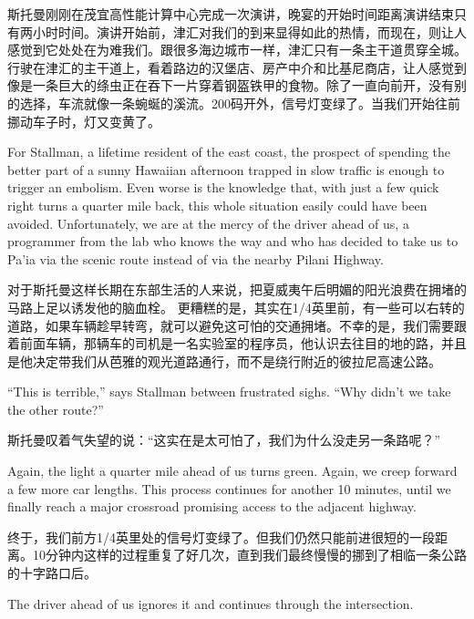 \ifdefined\chs
斯托曼刚刚在茂宜高性能计算中心完成一次演讲，晚宴的开始时间距离演讲结束只有两小时时间。演讲开始前，津汇对我们的到来显得如此的热情，而现在，则让人感觉到它处处在为难我们。跟很多海边城市一样，津汇只有一条主干道贯穿全城。行驶在津汇的主干道上，看着路边的汉堡店、房产中介和比基尼商店，让人感觉到像是一条巨大的绦虫正在吞下一片穿着钢盔铁甲的食物。除了一直向前开，没有别的选择，车流就像一条蜿蜒的溪流。200码开外，信号灯变绿了。当我们开始往前挪动车子时，灯又变黄了。
\fi

\ifdefined\eng
For Stallman, a lifetime resident of the east coast, the prospect of spending the better part of a sunny Hawaiian afternoon trapped in slow traffic is enough to trigger an embolism. %
Even worse is the knowledge that, with just a few quick right turns a quarter mile back, this whole situation easily could have been avoided. Unfortunately, we are at the mercy of the driver ahead of us, a programmer from the lab who knows the way and who has decided to take us to Pa'ia via the scenic route instead of via the nearby Pilani Highway.
\fi

\ifdefined\chs
对于斯托曼这样长期在东部生活的人来说，把夏威夷午后明媚的阳光浪费在拥堵的马路上足以诱发他的脑血栓。%
更糟糕的是，其实在1/4英里前，有一些可以右转的道路，如果车辆趁早转弯，就可以避免这可怕的交通拥堵。不幸的是，我们需要跟着前面车辆，那辆车的司机是一名实验室的程序员，他认识去往目的地的路，并且是他决定带我们从芭雅的观光道路通行，而不是绕行附近的彼拉尼高速公路。
\fi

\ifdefined\eng
``This is terrible,'' says Stallman between frustrated sighs. ``Why didn't we take the other route?''
\fi

\ifdefined\chs
斯托曼叹着气失望的说：``这实在是太可怕了，我们为什么没走另一条路呢？''
\fi

\ifdefined\eng
Again, the light a quarter mile ahead of us turns green. Again, we creep forward a few more car lengths. This process continues for another 10 minutes, until we finally reach a major crossroad promising access to the adjacent highway.
\fi

\ifdefined\chs
终于，我们前方1/4英里处的信号灯变绿了。但我们仍然只能前进很短的一段距离。10分钟内这样的过程重复了好几次，直到我们最终慢慢的挪到了相临一条公路的十字路口后。
\fi

\ifdefined\eng
The driver ahead of us ignores it and continues through the intersection.
\fi

